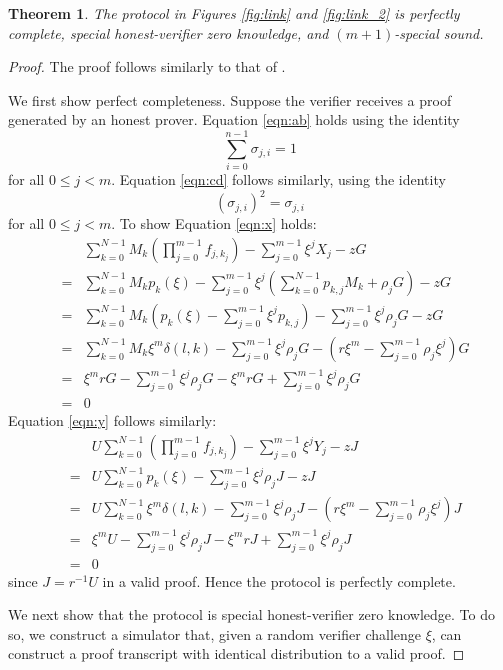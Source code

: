 \documentclass{article}
\newcommand{\sumi}{\sum_{i=0}^{n-1}}
\newcommand{\sumj}{\sum_{j=0}^{m-1}}
\newcommand{\sumk}{\sum_{k=0}^{N-1}}
\newtheorem{theorem}{Theorem}
\theoremstyle{definition}
\begin{document}
\begin{theorem}
The protocol in Figures \ref{fig:link} and \ref{fig:link_2} is perfectly complete, special honest-verifier zero knowledge, and $(m+1)$-special sound.
\end{theorem}

\begin{proof}
The proof follows similarly to that of \cite{bootle}.

We first show perfect completeness.
Suppose the verifier receives a proof generated by an honest prover.
Equation \ref{eqn:ab} holds using the identity $$\sumi \sigma_{j,i} = 1$$ for all $0 \leq j < m$.
Equation \ref{eqn:cd} follows similarly, using the identity $$\left(\sigma_{j,i}\right)^2 = \sigma_{j,i}$$ for all $0 \leq j < m$.
To show Equation \ref{eqn:x} holds:
\begin{eqnarray*}
&& \sumk M_k \left( \prod_{j=0}^{m-1} f_{j,k_j} \right) - \sumj \xi^jX_j - zG \\
&=& \sumk M_k p_k(\xi) - \sumj \xi^j \left( \sumk p_{k,j}M_k + \rho_jG \right) - zG \\
&=& \sumk M_k \left( p_k(\xi) - \sumj \xi^j p_{k,j} \right) - \sumj \xi^j \rho_jG - zG \\
&=& \sumk M_k \xi^m \delta(l,k) - \sumj \xi^j \rho_jG - \left( r\xi^m - \sumj \rho_j\xi^j \right)G \\
&=& \xi^mrG - \sumj \xi^j \rho_jG - \xi^mrG + \sumj \xi^j \rho_jG \\
&=& 0
\end{eqnarray*}
Equation \ref{eqn:y} follows similarly:
\begin{eqnarray*}
&& U \sumk \left( \prod_{j=0}^{m-1} f_{j,k_j} \right) - \sumj \xi^jY_j - zJ \\
&=& U \sumk p_k(\xi) - \sumj \xi^j \rho_jJ - zJ \\
&=& U \sumk \xi^m \delta(l,k) - \sumj \xi^j \rho_jJ - \left( r\xi^m - \sumj \rho_j\xi^j \right)J \\
&=& \xi^mU - \sumj \xi^j \rho_jJ - \xi^m rJ + \sumj \xi^j \rho_jJ \\
&=& 0
\end{eqnarray*}
since $J = r^{-1}U$ in a valid proof.
Hence the protocol is perfectly complete.

We next show that the protocol is special honest-verifier zero knowledge.
To do so, we construct a simulator that, given a random verifier challenge $\xi$, can construct a proof transcript with identical distribution to a valid proof.


\end{proof}
\end{document}
